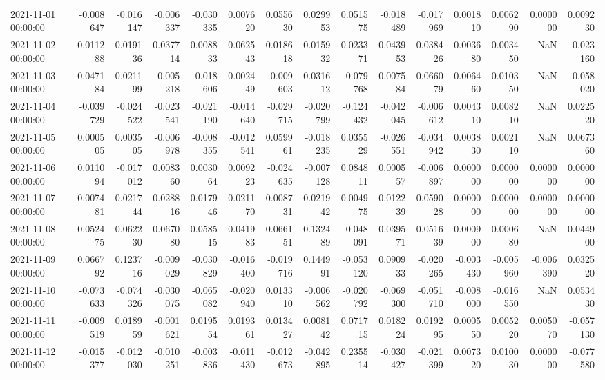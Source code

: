 \begin{tabular}{lrrrrrrrrrrrrrr}
2021-11-01 00:00:00 & -0.008647 & -0.016147 & -0.006337 & -0.030335 & 0.007620 & 0.055630 & 0.029953 & 0.051575 & -0.018489 & -0.017969 & 0.001810 & 0.006290 & 0.000000 & 0.009230 \\
2021-11-02 00:00:00 & 0.011288 & 0.019136 & 0.037714 & 0.008833 & 0.062543 & 0.018618 & 0.015932 & 0.023371 & 0.043953 & 0.038426 & 0.003680 & 0.003450 & NaN & -0.023160 \\
2021-11-03 00:00:00 & 0.047184 & 0.021199 & -0.005218 & -0.018606 & 0.002449 & -0.009603 & 0.031612 & -0.079768 & 0.007584 & 0.066079 & 0.006460 & 0.010350 & NaN & -0.058020 \\
2021-11-04 00:00:00 & -0.039729 & -0.024522 & -0.023541 & -0.021190 & -0.014640 & -0.029715 & -0.020799 & -0.124432 & -0.042045 & -0.006612 & 0.004310 & 0.008210 & NaN & 0.022520 \\
2021-11-05 00:00:00 & 0.000505 & 0.003505 & -0.006978 & -0.008355 & -0.012541 & 0.059961 & -0.018235 & 0.035529 & -0.026551 & -0.034942 & 0.003830 & 0.002110 & NaN & 0.067360 \\
2021-11-06 00:00:00 & 0.011094 & -0.017012 & 0.008360 & 0.003064 & 0.009223 & -0.024635 & -0.007128 & 0.084811 & 0.000557 & -0.006897 & 0.000000 & 0.000000 & 0.000000 & 0.000000 \\
2021-11-07 00:00:00 & 0.007481 & 0.021744 & 0.028816 & 0.017946 & 0.021170 & 0.008731 & 0.021942 & 0.004975 & 0.012239 & 0.059028 & 0.000000 & 0.000000 & 0.000000 & 0.000000 \\
2021-11-08 00:00:00 & 0.052475 & 0.062230 & 0.067080 & 0.058515 & 0.041983 & 0.066151 & 0.132489 & -0.048091 & 0.039571 & 0.051639 & 0.000900 & 0.000680 & NaN & 0.044900 \\
2021-11-09 00:00:00 & 0.066792 & 0.123716 & -0.009029 & -0.030829 & -0.016400 & -0.019716 & 0.144991 & -0.053120 & 0.090933 & -0.020265 & -0.003430 & -0.005960 & -0.006390 & 0.032520 \\
2021-11-10 00:00:00 & -0.073633 & -0.074326 & -0.030075 & -0.065082 & -0.020940 & 0.013310 & -0.006562 & -0.020792 & -0.069300 & -0.051710 & -0.008000 & -0.016550 & NaN & 0.053430 \\
2021-11-11 00:00:00 & -0.009519 & 0.018959 & -0.001621 & 0.019554 & 0.019361 & 0.013427 & 0.008142 & 0.071715 & 0.018224 & 0.019295 & 0.000550 & 0.005220 & 0.005070 & -0.057130 \\
2021-11-12 00:00:00 & -0.015377 & -0.012030 & -0.010251 & -0.003836 & -0.011430 & -0.012673 & -0.042895 & 0.235514 & -0.030427 & -0.021399 & 0.007320 & 0.010030 & 0.000000 & -0.077580 \\

\end{tabular}
